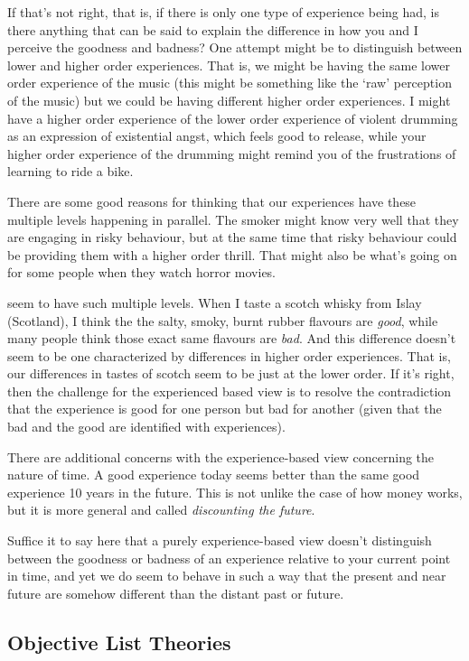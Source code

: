 \documentclass[]{tufte-book}
\begin{document}
If that's not right, that is, if there is only one type of experience being had, is there anything that can be said to explain the difference in how you and I perceive the goodness and badness? One attempt might be to distinguish between lower and higher order experiences. That is, we might be having the same lower order experience of the music (this might be something like the `raw' perception of the music) but we could be having different higher order experiences. I might have a higher order experience of the lower order experience of violent drumming as an expression of existential angst, which feels good to release, while your higher order experience of the drumming might remind you of the frustrations of learning to ride a bike.

There are some good reasons for thinking that our experiences have these multiple levels happening in parallel. The smoker might know very well that they are engaging in risky behaviour, but at the same time that risky behaviour could be providing them with a higher order thrill. That might also be what's going on for some people when they watch horror movies.

 seem to have such multiple levels. When I taste a scotch whisky from Islay (Scotland), I think the the salty, smoky, burnt rubber flavours are \emph{good}, while many people think those exact same flavours are \emph{bad}. And this difference doesn't seem to be one characterized by differences in higher order experiences. That is, our differences in tastes of scotch seem to be just at the lower order. If it's right, then the challenge for the experienced based view is to resolve the contradiction that the experience is good for one person but bad for another (given that the bad and the good are identified with experiences).

There are additional concerns with the experience-based view concerning the nature of time. A good experience today seems better than the same good experience 10 years in the future. This is not unlike the case of how money works, but it is more general and called \emph{discounting the future}.

Suffice it to say here that a purely experience-based view doesn't distinguish between the goodness or badness of an experience relative to your current point in time, and yet we do seem to behave in such a way that the present and near future are somehow different than the distant past or future.

\hypertarget{objective-list-theories}{%
\subsection{Objective List Theories}\label{objective-list-theories}}
\end{document}
